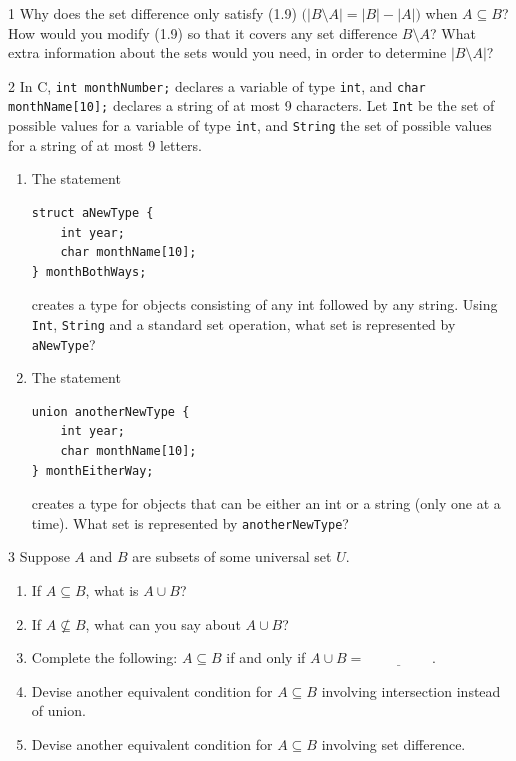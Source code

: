
\begin{exercise}{1}
    Why does the set difference only satisfy (1.9) $\bigl(|B\setminus A| = |B|-|A|\bigr)$
    when $A\subseteq B$? How would you modify (1.9) so that it covers any set
    difference $B\setminus A$? What extra information about the sets would you
    need, in order to determine $|B\setminus A|$?
\end{exercise}

\begin{exercise}{2}
    In C, \texttt{int monthNumber;} declares a variable of type \texttt{int},
    and \texttt{char monthName[10];} declares a string of at most 9 characters.
    Let \texttt{Int} be the set of possible values for a variable of type
    \texttt{int}, and \texttt{String} the set of possible values for a string of
    at most 9 letters.
    \begin{enumerate}[label=(\alph*)]
        \item The statement
\begin{verbatim}
struct aNewType {
    int year;
    char monthName[10];
} monthBothWays;
\end{verbatim}
        creates a type for objects consisting of any int followed by any string.
        Using \texttt{Int}, \texttt{String} and a standard set operation, what
        set is represented by \texttt{aNewType}?
        \item The statement
\begin{verbatim}
union anotherNewType {
    int year;
    char monthName[10];
} monthEitherWay;
\end{verbatim}
        creates a type for objects that can be either an int or a string (only
        one at a time). What set is represented by \texttt{anotherNewType}?
    \end{enumerate}
\end{exercise}

\begin{exercise}{3}
    Suppose $A$ and $B$ are subsets of some universal set $U$.
    \begin{enumerate}[label=(\alph*)]
        \item If $A\subseteq B$, what is $A\cup B$?
        \item If $A\not\subseteq B$, what can you say about $A\cup B$?
        \item Complete the following: $A\subseteq B$ if and only if
              $A\cup B = \underline{\hspace{2cm}}$.
        \item Devise another equivalent condition for $A\subseteq B$ involving
              intersection instead of union.
        \item Devise another equivalent condition for $A\subseteq B$ involving
              set difference.
    \end{enumerate}
\end{exercise}

